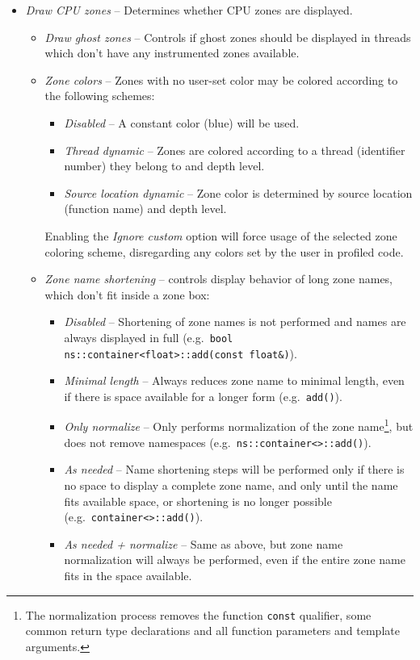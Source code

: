 \documentclass[hidelinks,titlepage,a4paper,twoside]{article}
\begin{document}
\begin{itemize}
\item \emph{\faMicrochip{} Draw CPU zones} -- Determines whether CPU zones are displayed.
\begin{itemize}
\item \emph{\faGhost{} Draw ghost zones} -- Controls if ghost zones should be displayed in threads which don't have any instrumented zones available.
\item \emph{\faPalette{} Zone colors} -- Zones with no user-set color may be colored according to the following schemes:
\begin{itemize}
\item \emph{Disabled} -- A constant color (blue) will be used.
\item \emph{Thread dynamic} -- Zones are colored according to a thread (identifier number) they belong to and depth level.
\item \emph{Source location dynamic} -- Zone color is determined by source location (function name) and depth level.
\end{itemize}
Enabling the \emph{Ignore custom} option will force usage of the selected zone coloring scheme, disregarding any colors set by the user in profiled code.
\item \emph{\faRulerHorizontal{} Zone name shortening} -- controls display behavior of long zone names, which don't fit inside a zone box:
\begin{itemize}
\item \emph{Disabled} -- Shortening of zone names is not performed and names are always displayed in full (e.g.\ \texttt{bool ns::container<float>::add(const float\&)}).
\item \emph{Minimal length} -- Always reduces zone name to minimal length, even if there is space available for a longer form (e.g.\ \texttt{add()}).
\item \emph{Only normalize} -- Only performs normalization of the zone name\footnote{The normalization process removes the function \texttt{const} qualifier, some common return type declarations and all function parameters and template arguments.}, but does not remove namespaces (e.g.\ \texttt{ns::container<>::add()}).
\item \emph{As needed} -- Name shortening steps will be performed only if there is no space to display a complete zone name, and only until the name fits available space, or shortening is no longer possible (e.g.\ \texttt{container<>::add()}).
\item \emph{As needed + normalize} -- Same as above, but zone name normalization will always be performed, even if the entire zone name fits in the space available.

\end{itemize}
\end{itemize}
\end{itemize}
\end{document}
